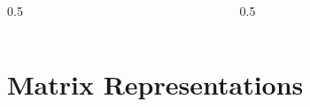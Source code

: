 \documentclass{beamer}
\begin{document}
\begin{frame}
    \begin{columns}
        \begin{column}{0.5\pagewidth}
            \begin{figure}[t]
                \centering
                
            \end{figure}
        \end{column}
        \begin{column}{0.5\pagewidth}
            \begin{figure}[t]
                \centering
                
            \end{figure}
        \end{column}
    \end{columns}
\end{frame}

\section{Matrix Representations}
\end{document}
